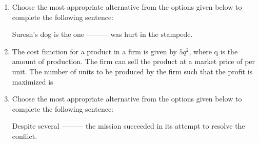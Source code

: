\documentclass[journal,12pt,onecolumn]{IEEEtran}
\begin{document}
\begin{enumerate}[resume]

    \item Choose the most appropriate alternative from the options given below to complete the following sentence:

          Suresh's dog is the one --------– was hurt in the stampede.

          \begin{enumerate}
          \end{enumerate}

    \item The cost function for a product in a firm is given by \(5q^2\), where q is the amount of production. The firm can sell the product at a market price of  per unit. The number of units to be produced by the firm such that the profit is maximized is

          \begin{enumerate}
          \end{enumerate}

    \item Choose the most appropriate alternative from the options given below to complete the following sentence:

          Despite several --------– the mission succeeded in its attempt to resolve the conflict.

          \begin{enumerate}
          \end{enumerate}


\end{enumerate}
\end{document}
